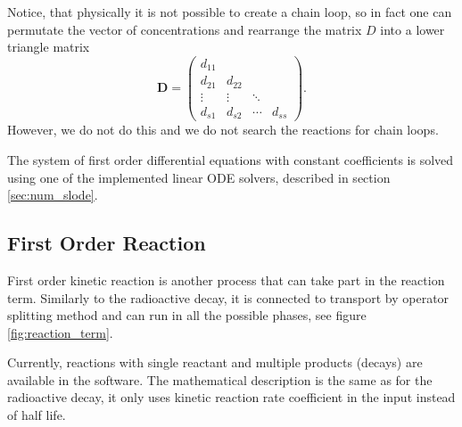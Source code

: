 Notice, that physically it is not possible to create a chain loop, so in fact one can permutate the vector of 
concentrations and rearrange the matrix $D$ into a lower triangle matrix
\[
\mathbf{D} = \begin{pmatrix} d_{11} &  &  &  \\ 
                  d_{21} & d_{22} & &  \\
                  \vdots &\vdots& \ddots &  \\
                  d_{s1} &d_{s2}& \cdots & d_{ss} \end{pmatrix}.
\]
However, we do not do this and we do not search the reactions for chain loops.

The system of first order differential equations with constant coefficients is solved using one of the
implemented linear ODE solvers, described in section \ref{sec:num_slode}.


\subsection{First Order Reaction}
\label{sec:first_order_reaction}
First order kinetic reaction is another process that can take part in the reaction term. Similarly to the
radioactive decay, it is connected to transport by operator splitting method and can run in all the possible
phases, see figure \ref{fig:reaction_term}.

Currently, reactions with single reactant and multiple products (decays) are available in the software.
The mathematical description is the same as for the radioactive decay, it only uses kinetic reaction rate
coefficient  in the input instead of half life.







